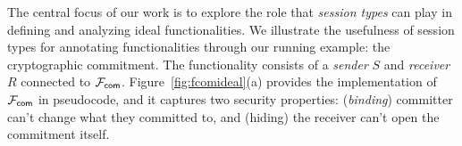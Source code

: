 
The central focus of our work is to explore the role that \emph{session types} can play in defining and analyzing ideal functionalities.
We illustrate the usefulness of session types for annotating functionalities through our running example: the cryptographic commitment.
The functionality consists of a \emph{sender} $S$ and \emph{receiver} $R$ connected to $\mathcal{F}_{{\mathsf {com}}}$.
Figure~\ref{fig:fcomideal}(a) provides the implementation of $\mathcal{F}_{{\mathsf {com}}}$ in pseudocode, and 
it captures two security properties: (\emph{binding}) committer can't change what they committed to, and (hiding) the receiver can't open the commitment itself. 

